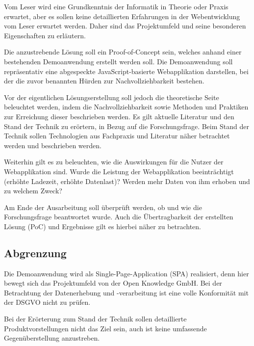 Vom Leser wird eine Grundkenntnis der Informatik in Theorie oder Praxis erwartet, aber es sollen keine detaillierten Erfahrungen in der Webentwicklung vom Leser erwartet werden. Daher sind das Projektumfeld und seine besonderen Eigenschaften zu erläutern.

Die anzustrebende Lösung soll ein Proof-of-Concept sein, welches anhand einer bestehenden Demoanwendung erstellt werden soll. Die Demoanwendung soll repräsentativ eine abgespeckte JavaScript-basierte Webapplikation darstellen, bei der die zuvor benannten Hürden zur Nachvollziehbarkeit bestehen.

Vor der eigentlichen Lösungserstellung soll jedoch die theoretische Seite beleuchtet werden, indem die Nachvollziehbarkeit sowie Methoden und Praktiken zur Erreichung dieser beschrieben werden. Es gilt aktuelle Literatur und den Stand der Technik zu erörtern, in Bezug auf die Forschungsfrage. Beim Stand der Technik sollen Technologien aus Fachpraxis und Literatur näher betrachtet werden und beschrieben werden.

Weiterhin gilt es zu beleuchten, wie die Auswirkungen für die Nutzer der Webapplikation sind. Wurde die Leistung der Webapplikation beeinträchtigt (erhöhte Ladezeit, erhöhte Datenlast)? Werden mehr Daten von ihm erhoben und zu welchem Zweck?

Am Ende der Ausarbeitung soll überprüft werden, ob und wie die Forschungsfrage beantwortet wurde. Auch die Übertragbarkeit der erstellten Lösung (PoC) und Ergebnisse gilt es hierbei näher zu betrachten.

\subsection{Abgrenzung}


Die Demoanwendung wird als Single-Page-Application (SPA) realisiert, denn hier bewegt sich das Projektumfeld von der Open Knowledge GmbH. Bei der Betrachtung der Datenerhebung und -verarbeitung ist eine volle Konformität mit der DSGVO nicht zu prüfen.

Bei der Erörterung zum Stand der Technik sollen detaillierte Produktvorstellungen nicht das Ziel sein, auch ist keine umfassende Gegenüberstellung anzustreben.

\pagebreak

